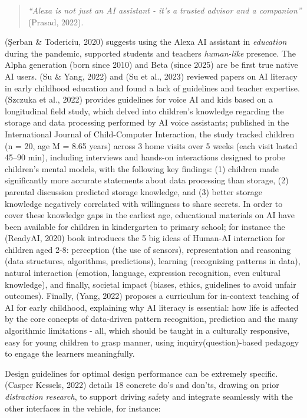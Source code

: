 \documentclass[
  letterpaper,
  DIV=11,
  numbers=noendperiod]{scrartcl}
\begin{document}
\begin{quote}
\emph{``Alexa is not just an AI assistant - it's a trusted advisor and a
companion''} (Prasad, 2022).
\end{quote}

(Şerban \& Todericiu, 2020) suggests using the Alexa AI assistant in
\emph{education} during the pandemic, supported students and teachers
\emph{human-like} presence. The Alpha generation (born since 2010) and
Beta (since 2025) are be first true native AI users. (Su \& Yang, 2022)
and (Su et al., 2023) reviewed papers on AI literacy in early childhood
education and found a lack of guidelines and teacher expertise. (Szczuka
et al., 2022) provides guidelines for voice AI and kids based on a
longitudinal field study, which delved into children's knowledge
regarding the storage and data processing performed by AI voice
assistants; published in the International Journal of Child-Computer
Interaction, the study tracked children (n = 20, age M = 8.65 years)
across 3 home visits over 5 weeks (each visit lasted 45--90 min),
including interviews and hands-on interactions designed to probe
children's mental models, with the following key findings: (1) children
made significantly more accurate statements about data processing than
storage, (2) parental discussion predicted storage knowledge, and (3)
better storage knowledge negatively correlated with willingness to share
secrets. In order to cover these knowledge gaps in the earliest age,
educational materials on AI have been available for children in
kindergarten to primary school; for instance the (ReadyAI, 2020) book
introduces the 5 big ideas of Human-AI interaction for children aged
2-8: perception (the use of sensors), representation and reasoning (data
structures, algorithms, predictions), learning (recognizing patterns in
data), natural interaction (emotion, language, expression recognition,
even cultural knowledge), and finally, societal impact (biases, ethics,
guidelines to avoid unfair outcomes). Finally, (Yang, 2022) proposes a
curriculum for in-context teaching of AI for early childhood, explaining
why AI literacy is essential: how life is affected by the core concepts
of data-driven pattern recognition, prediction and the many algorithmic
limitations - all, which should be taught in a culturally responsive,
easy for young children to grasp manner, using inquiry(question)-based
pedagogy to engage the learners meaningfully.

Design guidelines for optimal design performance can be extremely
specific. (Casper Kessels, 2022) details 18 concrete do's and don'ts,
drawing on prior \emph{distraction research}, to support driving safety
and integrate seamlessly with the other interfaces in the vehicle, for
instance:
\end{document}
